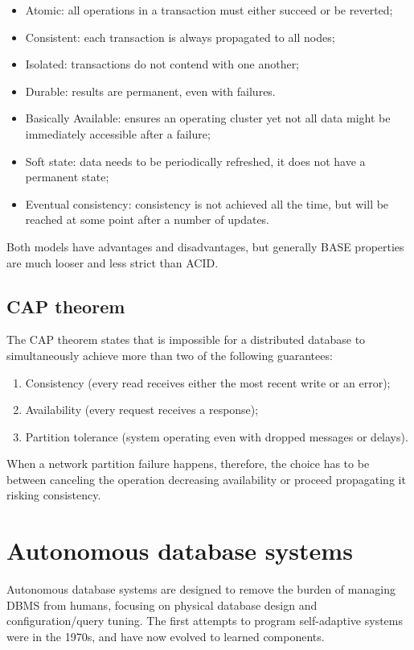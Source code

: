 \begin{itemize}
	\item Atomic: all operations in a transaction must either succeed or be reverted;
	\item Consistent: each transaction is always propagated to all nodes;
	\item Isolated: transactions do not contend with one another;
	\item Durable: results are permanent, even with failures.
\end{itemize}

\begin{itemize}
	\item Basically Available: ensures an operating cluster yet not all data might be immediately accessible after a failure;
	\item Soft state: data needs to be periodically refreshed, it does not have a permanent state;
	\item Eventual consistency: consistency is not achieved all the time, but will be reached at some point after a number of updates.
\end{itemize}

Both models have advantages and disadvantages, but generally BASE properties are much looser and less strict than ACID. 

\subsection{CAP theorem}
The CAP theorem states that is impossible for a distributed database to simultaneously achieve more than two of the following guarantees:
\begin{enumerate}
	\item Consistency (every read receives either the most recent write or an error);
	\item Availability (every request receives a response);
	\item Partition tolerance (system operating even with dropped messages or delays).
\end{enumerate}
When a network partition failure happens, therefore, the choice has to be between canceling the operation decreasing availability or proceed propagating it risking consistency.


\section{Autonomous database systems}
Autonomous database systems are designed to remove the burden of managing DBMS from humans, focusing on physical database design and configuration/query tuning. The first attempts to program self-adaptive systems were in the 1970s, and have now evolved to learned components. 

